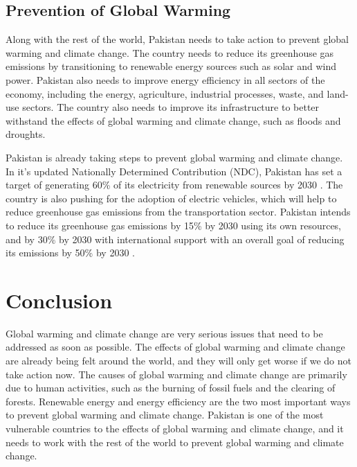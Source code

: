 \documentclass{article}
\begin{document}
\subsection{Prevention of Global Warming}
Along with the rest of the world, Pakistan needs to take action to prevent
global warming and climate change. The country needs to reduce its greenhouse
gas emissions by transitioning to renewable energy sources such as solar and
wind power. Pakistan also needs to improve energy efficiency in all sectors of
the economy, including the energy, agriculture, industrial processes, waste,
and land-use sectors. The country also needs to improve its infrastructure to
better withstand the effects of global warming and climate change, such as
floods and droughts.

Pakistan is already taking steps to prevent global warming and climate change.
In it's updated Nationally Determined Contribution (NDC), Pakistan has set a
target of generating 60\% of its electricity from renewable sources by 2030
\cite{UNDP_Climate_Promise}. The country is also pushing for the adoption of
electric vehicles, which will help to reduce greenhouse gas emissions from the
transportation sector. Pakistan intends to reduce its greenhouse gas emissions
by 15\% by 2030 using its own resources, and by 30\% by 2030 with international
support with an overall goal of reducing its emissions by 50\% by 2030
\cite{UNDP_Climate_Promise}.

\section{Conclusion}
Global warming and climate change are very serious issues that need to be
addressed as soon as possible. The effects of global warming and climate change
are already being felt around the world, and they will only get worse if we do
not take action now. The causes of global warming and climate change are
primarily due to human activities, such as the burning of fossil fuels and the
clearing of forests. Renewable energy and energy efficiency are the two most
important ways to prevent global warming and climate change. Pakistan is one of
the most vulnerable countries to the effects of global warming and climate
change, and it needs to work with the rest of the world to prevent global
warming and climate change.

\printbibliography
\end{document}
